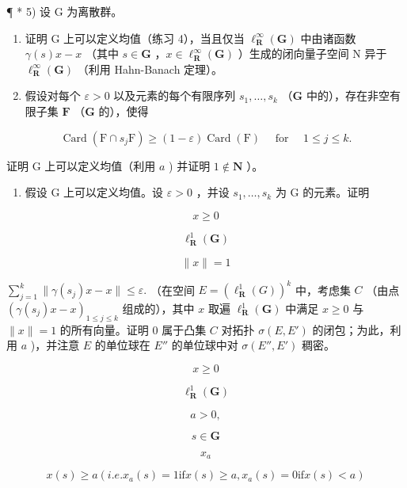 ¶ * 5) 设 G 为离散群。

\begin{enumerate}
\def\labelenumi{\alph{enumi})}
\item
  证明 G 上可以定义均值（练习 4），当且仅当 \(\ell_{\mathbf{R}}^{\infty}(\mathbf{G})\) 中由诸函数 \(\gamma(s)x - x\) （其中 \(s \in \mathbf{G}\) ，\(x \in \ell_{\mathbf{R}}^{\infty}(\mathbf{G})\) ）生成的闭向量子空间 N 异于 \(\ell_{\mathbf{R}}^{\infty}(\mathbf{G})\) （利用 Hahn-Banach 定理）。
\item
  假设对每个 \(\varepsilon > 0\) 以及元素的每个有限序列 \(s_1, \ldots, s_k\) （\(\mathbf{G}\) 中的），存在非空有限子集 \(\mathbf{F}\) （\(\mathbf{G}\) 的），使得
\end{enumerate}

\[
\operatorname{Card} (\mathrm{F} \cap s _ {j} \mathrm{F}) \geqslant (1 - \varepsilon) \operatorname{Card} (\mathrm{F}) \quad \text { for } \quad 1 \leqslant j \leqslant k.
\]

证明 G 上可以定义均值（利用 \(a\) ) 并证明 \(1 \notin \mathbf{N}\) ）。

\begin{enumerate}
\def\labelenumi{\alph{enumi})}
\setcounter{enumi}{2}
\tightlist
\item
  假设 G 上可以定义均值。设 \(\varepsilon > 0\) ，并设 \(s_1, \ldots, s_k\) 为 G 的元素。证明
\end{enumerate}

\[
x \geqslant 0
\]

\[
\ell_ {\mathbf {R}} ^ {1} (\mathbf {G})
\]

\[
\| x \| = 1
\]

\(\sum_{j=1}^{k}\|\gamma(s_j)x - x\| \leqslant \varepsilon.\) （在空间 \(E = (\ell_{\mathbf{R}}^1(G))^k\) 中，考虑集 \(C\) （由点 \((\gamma(s_j)x - x)_{1\leqslant j\leqslant k}\) 组成的），其中 \(x\) 取遍 \(\ell_{\mathbf{R}}^{1}(\mathbf{G})\) 中满足 \(x \geqslant 0\) 与 \(\| x \| = 1\) 的所有向量。证明 0 属于凸集 \(C\) 对拓扑 \(\sigma(E, E')\) 的闭包；为此，利用 \(a\) )，并注意 \(E\) 的单位球在 \(E''\) 的单位球中对 \(\sigma(E'', E')\) 稠密。

\[
x \geqslant 0
\]

\[
\ell_ {\mathbf {R}} ^ {1} (\mathbf {G})
\]

\[
a > 0,
\]

\[
s \in \mathbf {G}
\]

\[
x _ {a}
\]

\[
x (s) \geqslant a (i. e. x _ {a} (s) = 1 \text {if} x (s) \geqslant a, x _ {a} (s) = 0 \text {if} x (s) <   a)
\]

